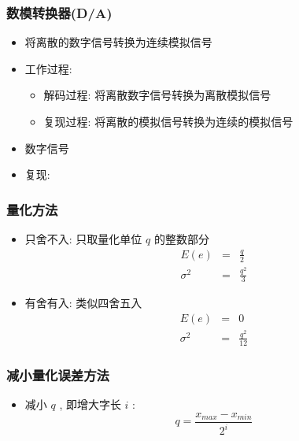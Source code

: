 \documentclass[table]{beamer}
\begin{document}
\begin{frame}
\frametitle{数模转换器(D/A)}
\label{sec-1-3-3}

\begin{itemize}
\item 将离散的数字信号转换为连续模拟信号
\item <2->工作过程:
\begin{itemize}
\item 解码过程: 将离散数字信号转换为离散模拟信号
\item 复现过程: 将离散的模拟信号转换为连续的模拟信号
\end{itemize}
\end{itemize}
\begin{itemize}

\item 数字信号
\label{sec-1-3-3-1}%

\item 复现:
\label{sec-1-3-3-2}%

\end{itemize} %
\end{frame}
\begin{frame}
\frametitle{量化方法}
\label{sec-1-3-4}

\begin{itemize}
\item <2->只舍不入: 只取量化单位  $q$  的整数部分
       	\begin{eqnarray*}
	 E(e) &=& \frac{q}{2} \\
	 \sigma^2 &=& \frac{q^2}{3}
       	\end{eqnarray*}
\item <3->有舍有入: 类似四舍五入
       	\begin{eqnarray*}
	 E(e) &=& 0 \\
	 \sigma^2 &=& \frac{q^2}{12}
       	\end{eqnarray*}
\end{itemize}
\end{frame}
\begin{frame}
\frametitle{减小量化误差方法}
\label{sec-1-3-5}

\begin{itemize}
\item 减小  $q$  , 即增大字长  $i$  :   
         \[q=\frac{x_{max}-x_{min}}{2^i}\]
\end{itemize}
\end{frame}
\end{document}
